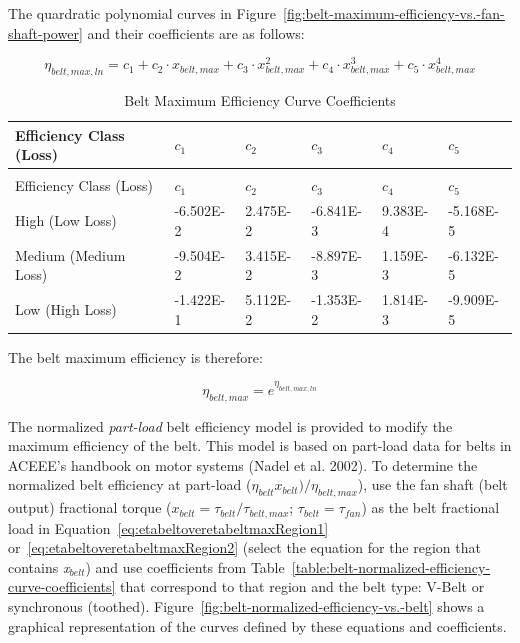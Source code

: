 {{{The quardratic polynomial curves in Figure~\ref{fig:belt-maximum-efficiency-vs.-fan-shaft-power} and their coefficients are as follows:

\begin{equation}
{\eta_{belt,max,ln}} = {c_1} + {c_2} \cdot {x_{belt,max}} + {c_3} \cdot x_{belt,max}^2 + {c_4} \cdot x_{belt,max}^3 + {c_5} \cdot x_{belt,max }^4
\end{equation}

\begin{longtable}[c]{p{1.0in}p{1.0in}p{1.0in}p{1.0in}p{1.0in}p{1.0in}}
\caption{Belt Maximum Efficiency Curve Coefficients \label{table:belt-maximum-efficiency-curve-coefficients}} \tabularnewline
\toprule 
Efficiency Class (Loss) & \(c_1\) & \(c_2\) & \(c_3\) & \(c_4\) & \(c_5\) \tabularnewline
\midrule
\endfirsthead

\caption[]{Belt Maximum Efficiency Curve Coefficients} \tabularnewline
\toprule 
Efficiency Class (Loss) & \(c_1\) & \(c_2\) & \(c_3\) & \(c_4\) & \(c_5\) \tabularnewline
\midrule
\endhead

High (Low Loss) & -6.502E-2 & 2.475E-2 & -6.841E-3 & 9.383E-4 & -5.168E-5 \tabularnewline
Medium (Medium Loss) & -9.504E-2 & 3.415E-2 & -8.897E-3 & 1.159E-3 & -6.132E-5 \tabularnewline
Low (High Loss) & -1.422E-1 & 5.112E-2 & -1.353E-2 & 1.814E-3 & -9.909E-5 \tabularnewline
\bottomrule
\end{longtable}

The belt maximum efficiency is therefore:

\begin{equation}
{\eta_{belt,max }} = {e^{{\eta_{belt,max,ln}}}}
\end{equation}

The normalized \emph{part-load} belt efficiency model is provided to modify the maximum efficiency of the belt. This model is based on part-load data for belts in ACEEE's handbook on motor systems (Nadel et al. 2002). To determine the normalized belt efficiency at part-load (\(\eta_{belt} {x_{belt}}) / \eta_{belt,max}\)), use the fan shaft (belt output) fractional torque (\(x_{belt} = \tau_{belt} / \tau_{belt,max}\); \(\tau_{belt} = \tau_{fan}\)) as the belt fractional load in Equation~\ref{eq:etabeltoveretabeltmaxRegion1} or~\ref{eq:etabeltoveretabeltmaxRegion2} (select the equation for the region that contains \emph{x\(_{belt}\)}) and use coefficients from Table~\ref{table:belt-normalized-efficiency-curve-coefficients} that correspond to that region and the belt type: V-Belt or synchronous (toothed). Figure~\ref{fig:belt-normalized-efficiency-vs.-belt} shows a graphical representation of the curves defined by these equations and coefficients.

}}}
